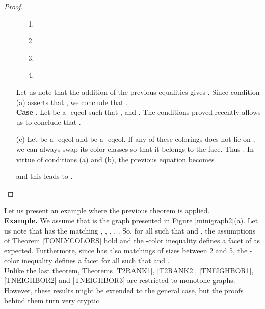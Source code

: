 \begin{proof}
\begin{enumerate}
\begin{enumerate}
\item[1.] 
\item[2.] 
\item[3.] 
\item[4.] 
\end{enumerate}
Let us note that the addition
of the previous equalities gives .
Since condition (a) asserts that , we conclude that
.\\
\textbf{Case }. Let  be a -eqcol such that ,  and
. The conditions proved recently allows us to conclude that
.
\item[(c)] Let  be a -eqcol and  be a -eqcol. If any of these colorings does not
lie on , we can always swap its color classes so that it belongs to the face.
Thus .
In virtue of conditions (a) and (b), the previous equation becomes

and this leads to .
\end{enumerate}
\end{proof}

Let us present an example where the previous theorem is applied.\\

\noindent \textbf{Example.} We assume that  is the graph presented in Figure \ref{minigraph2}(a). Let us note that  has the matching , , , , . So, for all  such that
 and , the assumptions of Theorem \ref{TONLYCOLORS}
hold and the -color inequality defines a facet of  as expected. Furthermore,
since  has also matchings of sizes between 2 and 5, the -color
inequality defines a facet for all  such that  and
.\\

Unlike the last theorem, Theorems \ref{T2RANK1}, \ref{T2RANK2}, \ref{TNEIGHBOR1}, \ref{TNEIGHBOR2}
and \ref{TNEIGHBOR3} are restricted to monotone graphs. However, these results might be extended to
the general case, but the proofs behind them turn very cryptic.

%